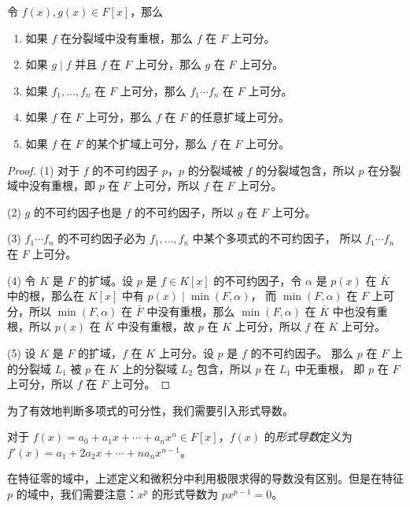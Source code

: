 \begin{lemma}
  令 $f(x),g(x)\in F[x]$，那么
  \begin{enumerate}
    \item 如果 $f$ 在分裂域中没有重根，那么 $f$ 在 $F$ 上可分。
    \item 如果 $g\mid f$ 并且 $f$ 在 $F$ 上可分，那么 $g$ 在 $F$ 上可分。
    \item 如果 $f_1,\dots,f_n$ 在 $F$ 上可分，那么 $f_1\cdots f_n$ 在 $F$ 上可分。
    \item 如果 $f$ 在 $F$ 上可分，那么 $f$ 在 $F$ 的任意扩域上可分。
    \item 如果 $f$ 在 $F$ 的某个扩域上可分，那么 $f$ 在 $F$ 上可分。
  \end{enumerate}
\end{lemma}
\begin{proof}
  (1) 对于 $f$ 的不可约因子 $p$，$p$ 的分裂域被 $f$ 的分裂域包含，所以 $p$
  在分裂域中没有重根，即 $p$ 在 $F$ 上可分，所以 $f$ 在 $F$ 上可分。

  (2) $g$ 的不可约因子也是 $f$ 的不可约因子，所以 $g$ 在 $F$ 上可分。

  (3) $f_1\cdots f_n$ 的不可约因子必为 $f_1,\dots,f_n$ 中某个多项式的不可约因子，
  所以 $f_1\cdots f_n$ 在 $F$ 上可分。

  (4) 令 $K$ 是 $F$ 的扩域。设 $p$ 是 $f\in K[x]$ 的不可约因子，令 $\alpha$
  是 $p(x)$ 在 $\bar K$ 中的根，那么在 $K[x]$ 中有 $p(x)\mid \min(F,\alpha)$，
  而 $\min(F,\alpha)$ 在 $F$ 上可分，所以 $\min(F,\alpha)$ 在 $\bar F$
  中没有重根，那么 $\min(F,\alpha)$ 在 $\bar K$ 中也没有重根，所以 $p(x)$
  在 $\bar K$ 中没有重根，故 $p$ 在 $K$ 上可分，所以 $f$ 在 $K$ 上可分。

  (5) 设 $K$ 是 $F$ 的扩域，$f$ 在 $K$ 上可分。设 $p$ 是 $f$ 的不可约因子。
  那么 $p$ 在 $F$ 上的分裂域 $L_1$
  被 $p$ 在 $K$ 上的分裂域 $L_2$ 包含，所以 $p$ 在 $L_1$ 中无重根，
  即 $p$ 在 $F$ 上可分，所以 $f$ 在 $F$ 上可分。
\end{proof}

为了有效地判断多项式的可分性，我们需要引入形式导数。

\begin{definition}
  对于 $f(x)=a_0+a_1x+\cdots+a_nx^n\in F[x]$，$f(x)$ 的\emph{形式导数}定义为
  $f'(x)=a_1+2a_2x+\cdots+na_nx^{n-1}$。
\end{definition}

在特征零的域中，上述定义和微积分中利用极限求得的导数没有区别。但是在特征 $p$
的域中，我们需要注意：$x^p$ 的形式导数为 $px^{p-1}=0$。

